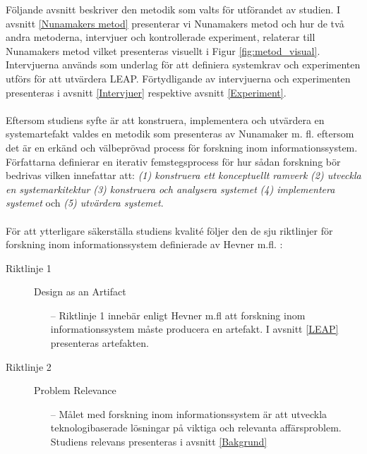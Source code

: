 \documentclass[a4paper,11pt]{article}
\begin{document}
{Följande avsnitt beskriver den metodik som valts för utförandet av studien.  I avsnitt \ref{Nunamakers metod} presenterar vi Nunamakers metod och hur de två andra metoderna, intervjuer och kontrollerade experiment, relaterar till Nunamakers metod vilket presenteras visuellt i Figur \ref{fig:metod_visual}. Intervjuerna används som underlag för att definiera systemkrav och experimenten utförs för att utvärdera LEAP. Förtydligande av intervjuerna och experimenten presenteras i avsnitt \ref{Intervjuer} respektive avsnitt \ref{Experiment}.
\\
\\
Eftersom studiens syfte är att konstruera, implementera och utvärdera en systemartefakt valdes en metodik som presenteras av Nunamaker m. fl. \cite{nunamaker} eftersom det är en erkänd och välbeprövad process för forskning inom informationssystem. Författarna definierar en iterativ femstegsprocess för hur sådan forskning bör bedrivas vilken innefattar att: \textit{(1) konstruera ett konceptuellt ramverk} \textit{(2) utveckla en systemarkitektur} \textit{(3) konstruera och analysera systemet} \textit{(4) implementera systemet} och \textit{(5) utvärdera systemet}. 
\\
\\
För att ytterligare säkerställa studiens kvalité följer den de sju riktlinjer för forskning inom informationssystem definierade av Hevner m.fl. \cite{hevner}:
\begin{description}
    \item [Riktlinje 1]
    Design as an Artifact
    \begin{itemize}
    \item [--] Riktlinje 1 innebär enligt Hevner m.fl att forskning inom informationssystem måste producera en artefakt. I avsnitt \ref{LEAP} presenteras artefakten.
    \end{itemize}
    \item [Riktlinje 2]
    Problem Relevance
     \begin{itemize}
    \item [--] Målet med forskning inom informationssystem är att utveckla teknologibaserade lösningar på viktiga och relevanta affärsproblem. Studiens relevans presenteras i avsnitt \ref{Bakgrund}

\end{itemize}
\end{description}}
\end{document}
